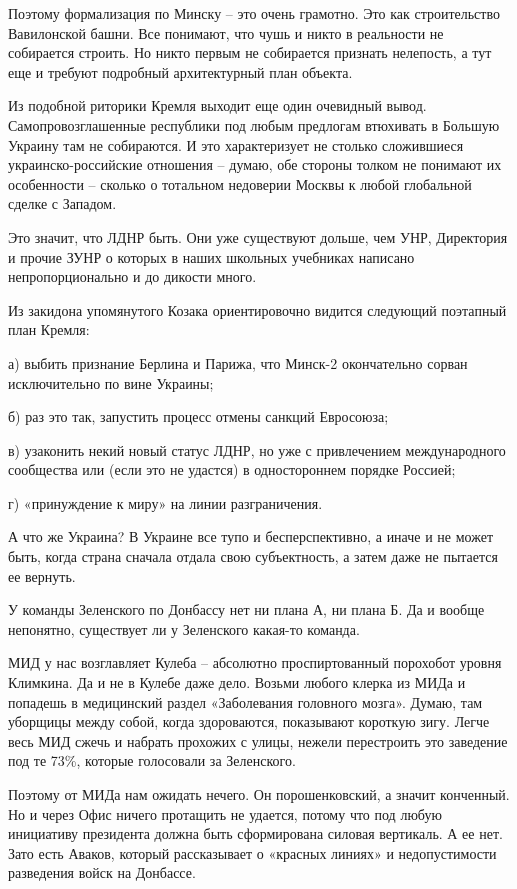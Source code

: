 Поэтому формализация по Минску – это очень грамотно. Это как строительство
Вавилонской башни. Все понимают, что чушь и никто в реальности не собирается
строить. Но никто первым не собирается признать нелепость, а тут еще и требуют
подробный архитектурный план объекта.

Из подобной риторики Кремля выходит еще один очевидный вывод.
Самопровозглашенные республики под любым предлогам втюхивать в Большую Украину
там не собираются. И это характеризует не столько сложившиеся
украинско-российские отношения – думаю, обе стороны толком не понимают их
особенности – сколько о тотальном недоверии Москвы к любой глобальной сделке с
Западом.

Это значит, что ЛДНР быть. Они уже существуют дольше, чем УНР, Директория и
прочие ЗУНР о которых в наших школьных учебниках написано непропорционально и
до дикости много.

Из закидона упомянутого Козака ориентировочно видится следующий поэтапный план
Кремля:

а) выбить признание Берлина и Парижа, что Минск-2 окончательно сорван
исключительно по вине Украины;

б) раз это так, запустить процесс отмены санкций Евросоюза;

в) узаконить некий новый статус ЛДНР, но уже с привлечением международного
сообщества или (если это не удастся) в одностороннем порядке Россией;

г) «принуждение к миру» на линии разграничения.

А что же Украина? В Украине все тупо и бесперспективно, а иначе и не может
быть, когда страна сначала отдала свою субъектность, а затем даже не пытается
ее вернуть.

У команды Зеленского по Донбассу нет ни плана А, ни плана Б. Да и вообще
непонятно, существует ли у Зеленского какая-то команда.

МИД у нас возглавляет Кулеба – абсолютно проспиртованный порохобот уровня
Климкина. Да и не в Кулебе даже дело. Возьми любого клерка из МИДа и попадешь в
медицинский раздел «Заболевания головного мозга». Думаю, там уборщицы между
собой, когда здороваются, показывают короткую зигу. Легче весь МИД сжечь и
набрать прохожих с улицы, нежели перестроить это заведение под те 73\%, которые
голосовали за Зеленского.

Поэтому от МИДа нам ожидать нечего. Он порошенковский, а значит конченный. Но и
через Офис ничего протащить не удается, потому что под любую инициативу
президента должна быть сформирована силовая вертикаль. А ее нет. Зато есть
Аваков, который рассказывает о «красных линиях» и недопустимости разведения
войск на Донбассе.

